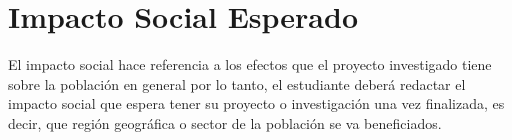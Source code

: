 \chapter{Impacto Social Esperado}
El impacto social hace referencia a los efectos que el proyecto investigado tiene sobre la población en general por lo tanto, el estudiante deberá redactar el impacto social que espera tener su proyecto o investigación una vez finalizada, es decir, que región geográfica o sector de la población se va beneficiados.
